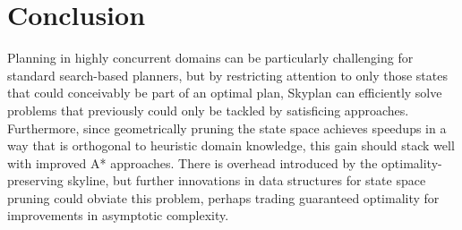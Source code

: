 \documentclass[letterpaper]{article}
\theoremstyle{plain} \newtheorem{theorem}{Theorem} \newtheorem{proposition}{Proposition} \newtheorem{lemma}{Lemma}
\theoremstyle{definition} \newtheorem{definition}{Definition} \newtheorem{conjecture}{Conjecture} \newtheorem*{example}{Example}
\theoremstyle{remark} \newtheorem*{remark}{Remark} \newtheorem*{note}{Note} \newtheorem{case}{Case}
\begin{document}
\section{Conclusion}

Planning in highly concurrent domains can be particularly challenging for standard
search-based planners, but by restricting attention to only those states that could
conceivably be part of an optimal plan, Skyplan can efficiently solve problems that
previously could only be tackled by satisficing approaches. Furthermore, since
geometrically pruning the state space achieves speedups in a way that is orthogonal to
heuristic domain knowledge, this gain should stack well with improved A* approaches. There
is overhead introduced by the optimality-preserving skyline, but further innovations in
data structures for state space pruning could obviate this problem, perhaps trading
guaranteed optimality for improvements in asymptotic complexity.



\end{document}
